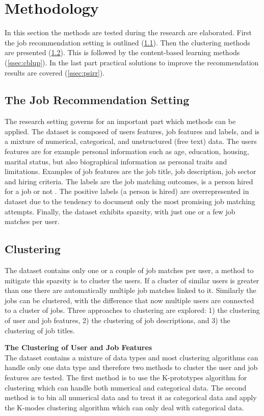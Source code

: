 \section{Methodology}
\label{sec:meth}

In this section the methods are tested during the research are elaborated. First the job recommendation setting is outlined (\ref{ssec:jrs}). Then the clustering methods are presented (\ref{ssec:clus}). This is followed by the content-based learning methods (\ref{ssec:cblup}). In the last part practical solutions to improve the recommendation results are covered (\ref{ssec:psirr}). 

\subsection{The Job Recommendation Setting}
\label{ssec:jrs}
The research setting governs for an important part which methods can be applied.
The dataset is composed of users features, job features and labels, and is a mixture of numerical, categorical, and unstructured (free text) data.
The users features are for example personal information such as age, education, housing, marital status, but also biographical information as personal traits and limitations. 
Examples of job features are the job title, job description, job sector and hiring criteria. 
The labels are the job matching outcomes, is a person hired for a job or not . 
The positive labels (a person is hired) are overrepresented in dataset due to the tendency to document only the most promising job matching attempts. 
Finally, the dataset exhibits sparsity, with just one or a few job matches per user.

\subsection{Clustering}
\label{ssec:clus}
The dataset contains only one or a couple of job matches per user, a method to mitigate this sparsity is to cluster the users. 
If a cluster of similar users is greater than one there are automatically multiple job matches linked to it. 
Similarly the jobs can be clustered, with the difference that now multiple users are connected to a cluster of jobs. 
Three approaches to clustering are explored: 1) the clustering of user and job features, 2) the clustering of job descriptions, and 3) the clustering of job titles. 

\noindent
\textbf{The Clustering of User and Job Features} \\
The dataset contains a mixture of data types and most clustering algorithms can handle only one data type and therefore two methods to cluster the user and job features are tested.
The first method is to use the K-prototypes algorithm \cite{huang1997clustering} for clustering which can handle both numerical and categorical data. 
The second method is to bin all numerical data and to treat it as categorical data and apply the K-modes clustering algorithm \cite{huang1997clustering, huang1998extensions} which can only deal with categorical data. 


